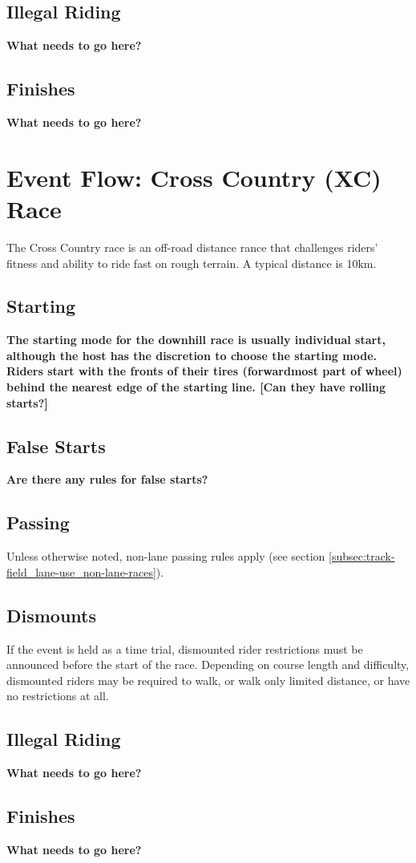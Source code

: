 \subsection{Illegal Riding}

\textbf{What needs to go here?}

\subsection{Finishes}

\textbf{What needs to go here?}

\section{Event Flow: Cross Country (XC) Race\label{sec:muni_xc}}

The Cross Country race is an off-road distance rance that challenges riders'
fitness and ability to ride fast on rough terrain. A typical distance is 10km.

\subsection{Starting}

\textbf{The starting mode for the downhill race is usually individual 
start, although the host has the discretion to choose the starting 
mode. Riders start with the fronts of their tires (forwardmost part of wheel)
 behind the nearest edge of the starting line. [Can they have rolling starts?]}

\subsection{False Starts}

\textbf{Are there any rules for false starts?}

\subsection{Passing}

Unless otherwise noted, non-lane passing rules apply (see section \ref{subsec:track-field_lane-use_non-lane-races}).

\subsection{Dismounts}

If the event is held as a time trial, dismounted rider restrictions must be announced before the start of the race.
Depending on course length and difficulty, dismounted riders may be required to walk, or walk only limited distance, or have no restrictions at all.

\subsection{Illegal Riding}

\textbf{What needs to go here?}

\subsection{Finishes}

\textbf{What needs to go here?}

